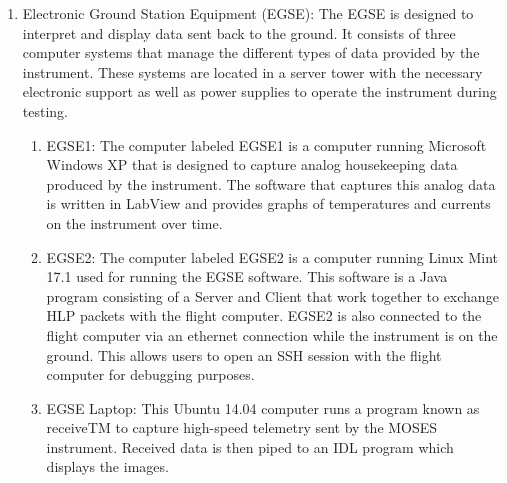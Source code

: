 \begin{enumerate}
		\item Electronic Ground Station Equipment (EGSE): The EGSE is designed to interpret and display data sent back to the ground. It consists of three computer systems that manage the different types of data provided by the instrument. These systems are located in a server tower with the necessary electronic support as well as power supplies to operate the instrument during testing.
		\begin{enumerate}
			\item EGSE1: The computer labeled EGSE1 is a computer running Microsoft Windows XP that is designed to capture analog housekeeping data produced by the instrument. The software that captures this analog data is written in LabView and provides graphs of temperatures and currents on the instrument over time.
			\item EGSE2: The computer labeled EGSE2 is a computer running Linux Mint 17.1 used for running the EGSE software. This software is a Java program consisting of a Server and Client that work together to exchange HLP packets with the flight computer. EGSE2 is also connected to the flight computer via an ethernet connection while the instrument is on the ground. This allows users to open an SSH session with the flight computer for debugging purposes.
			\item EGSE Laptop: This Ubuntu 14.04 computer runs a program known as receiveTM to capture high-speed telemetry sent by the MOSES instrument. Received data is then piped to an IDL program which displays the images.
		\end{enumerate}
	\end{enumerate}
